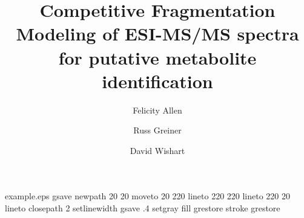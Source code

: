 \begin{filecontents*}{example.eps}
gsave
newpath
  20 20 moveto
  20 220 lineto
  220 220 lineto
  220 20 lineto
closepath
2 setlinewidth
gsave
  .4 setgray fill
grestore
stroke
grestore
\end{filecontents*}
\RequirePackage{fix-cm}
\documentclass[natbib]{svjour3}     
\smartqed  \usepackage{a4}
\usepackage{amsmath}
\usepackage{amssymb}
\usepackage{algorithm}
\usepackage{algorithmic}
\usepackage{wasysym}
\usepackage{graphicx}
\usepackage{url}
\usepackage{subfigure}
\usepackage{mathtools}
\usepackage{soul,color}

\journalname{}


\addtolength{\oddsidemargin}{-.4in}
\addtolength{\evensidemargin}{-.4in}
\addtolength{\textwidth}{0.8in}




\title{Competitive Fragmentation Modeling of ESI-MS/MS spectra for putative metabolite identification }



\author{Felicity Allen \and
        Russ Greiner \and
David Wishart
}



\institute{
}
\vspace{-8em}
\date{}



